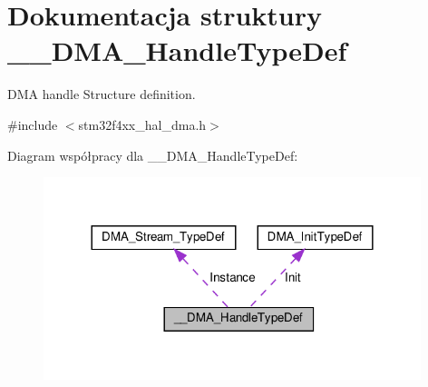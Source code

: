 \hypertarget{struct_____d_m_a___handle_type_def}{}\section{Dokumentacja struktury \+\_\+\+\_\+\+D\+M\+A\+\_\+\+Handle\+Type\+Def}
\label{struct_____d_m_a___handle_type_def}


D\+MA handle Structure definition.  




{\ttfamily \#include $<$stm32f4xx\+\_\+hal\+\_\+dma.\+h$>$}



Diagram współpracy dla \+\_\+\+\_\+\+D\+M\+A\+\_\+\+Handle\+Type\+Def\+:\nopagebreak
\begin{figure}[H]
\begin{center}
\leavevmode
\includegraphics[width=312pt]{struct_____d_m_a___handle_type_def__coll__graph}
\end{center}
\end{figure}
